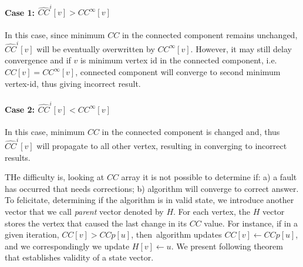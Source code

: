 \paragraph{Case 1: $\hat{CC}^{i}[v] > CC^{\infty}[v]$} 
In this case, since minimum $CC$ in the connected component remains unchanged,  $\hat{CC}^{i}[v]$ will be eventually overwritten by $CC^{\infty}[v]$. However, it may still delay convergence and if $v$ is minimum vertex id in the connected component, i.e. $CC[v]=CC^{\infty}[v]$, connected component will converge to second minimum vertex-id, thus giving incorrect result.


\paragraph{Case 2: $\hat{CC}^{i}[v] < CC^{\infty}[v]$} 
In this case, minimum $CC$ in the connected component is changed and, thus $\hat{CC}^{i}[v]$ will propagate to all other vertex, resulting in converging to incorrect results.

THe difficulty is, looking at $CC$ array it is not possible to determine if: a) a fault has occurred that needs corrections; b) algorithm will converge to correct answer. To felicitate, determining if the algorithm is in valid state, we introduce another vector that we call \emph{parent} vector denoted by $H$. 
For each vertex, the $H$ vector stores the vertex that caused the last change in its $CC$ value.
For instance, if in a given iteration, $CC[v]>CCp[u]$, then~\sv algorithm updates $CC[v]\leftarrow CCp[u]$, 
and we correspondingly we update $H[v]\leftarrow u$.
We present following theorem that establishes validity of a state vector. 


\begin{comment}
\begin{thm}
\label{thm:strong-SV-converg-cond}
Given a graph $G=(V,E)$ and a arbitrary state vector $S=(CC,H)$, the~\refalg{alg:SV_ALG} starting from $S$ will converge to correct solution defined by [insert ref to definition], if $S$ satisfies following condition:
%
\begin{enumerate*}
\item Parent of any vertex $v$ is either $v$ itself or it is one of neighbor: $H(v) \in \{ v, E(v)\}$;

\item if $H(v)=v$, then $CC(v)=v$;

\item $CC[v]\leq v$;

\item $CC[v]\geq CC[H[v]] $ ;and

\item There are no loop except self-loops in the directed graph $G^{*}$ defined by $G^{*} = (V,E^{*})$,
 where $E^{*}=\{ (v,H(v)) \forall v \in V \}$ .
\end{enumerate*}
\end{thm}
\end{comment}



